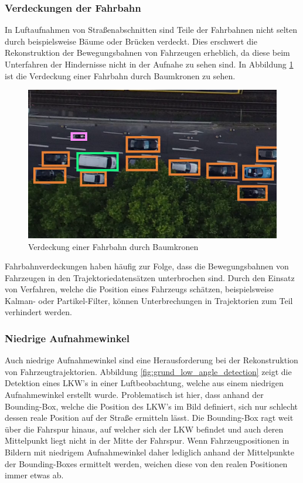 \subsubsection*{Verdeckungen der Fahrbahn}

In Luftaufnahmen von Straßenabschnitten sind Teile der Fahrbahnen nicht selten durch beispielsweise
Bäume oder Brücken verdeckt. Dies erschwert die Rekonstruktion der Bewegungsbahnen von Fahrzeugen erheblich, da diese
beim Unterfahren der Hindernisse nicht in der Aufnahe zu sehen sind. In Abbildung \ref{fig:grund_lane_occlusion}
ist die Verdeckung einer Fahrbahn durch Baumkronen zu sehen.

\begin{figure}[H]
    \centering
    \includegraphics[width=0.45\linewidth]{resources/img/grundlagen/TrajectoryReconstruction/challenges/Verdeckung}
    \caption[Fahrbahn Verdeckung]{Verdeckung einer Fahrbahn durch Baumkronen}
    \label{fig:grund_lane_occlusion}
\end{figure}

Fahrbahnverdeckungen haben häufig zur Folge, dass die Bewegungsbahnen von Fahrzeugen in den
Trajektoriedatensätzen unterbrochen sind.
Durch den Einsatz von Verfahren, welche die Position eines Fahrzeugs schätzen, beispielsweise
Kalman- oder Partikel-Filter, können Unterbrechungen in Trajektorien zum Teil verhindert werden.

\subsubsection*{Niedrige Aufnahmewinkel}

Auch niedrige Aufnahmewinkel sind eine Herausforderung bei der Rekonstruktion von Fahrzeugtrajektorien.
Abbildung \ref{fig:grund_low_angle_detection} zeigt die Detektion eines LKW's in einer Luftbeobachtung,
welche aus einem niedrigen Aufnahmewinkel erstellt wurde. Problematisch ist hier, dass anhand der Bounding-Box,
welche die Position des LKW's im Bild definiert, sich nur schlecht dessen reale Position auf der Straße ermitteln lässt.
Die Bounding-Box ragt weit über die Fahrspur hinaus, auf welcher sich der LKW befindet und auch deren Mittelpunkt
liegt nicht in der Mitte der Fahrspur. Wenn Fahrzeugpositionen in Bildern mit niedrigem Aufnahmewinkel daher lediglich
anhand der Mittelpunkte der Bounding-Boxes ermittelt werden, weichen diese von den realen Positionen immer etwas ab.

